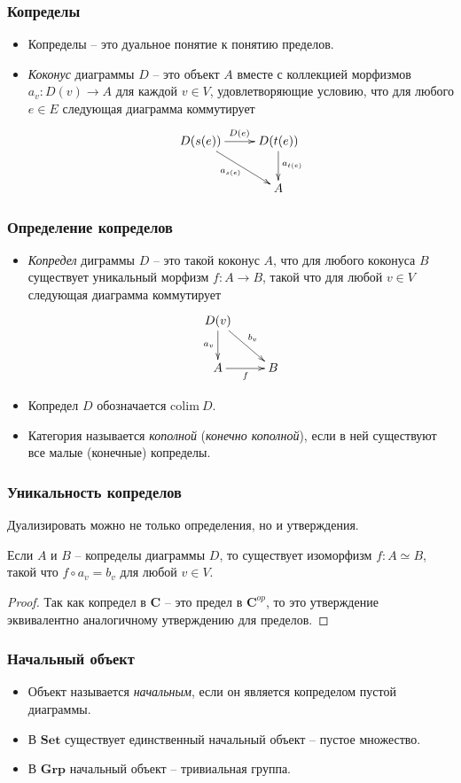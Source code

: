 \documentclass{beamer}
\theoremstyle{definition}
\newcommand{\cat}[1]{\mathbf{#1}}
\renewcommand{\C}{\cat{C}}
\newcommand{\Set}{\cat{Set}}
\newcommand{\Grp}{\cat{Grp}}
\begin{document}
\begin{frame}
\frametitle{Копределы}
\begin{itemize}
\item Копределы -- это дуальное понятие к понятию пределов.
\item \emph{Коконус} диаграммы $D$ -- это объект $A$ вместе с коллекцией морфизмов $a_v : D(v) \to A$ для каждой $v \in V$, удовлетворяющие условию, что для любого $e \in E$ следующая диаграмма коммутирует
\[ \xymatrix{ D(s(e)) \ar[rd]_{a_{s(e)}} \ar[r]^{D(e)} & D(t(e)) \ar[d]^{a_{t(e)}} \\
                                                       & A
            } \]
\end{itemize}
\end{frame}

\begin{frame}
\frametitle{Определение копределов}
\begin{itemize}
\item \emph{Копредел} диграммы $D$ -- это такой коконус $A$, что для любого коконуса $B$ существует уникальный морфизм $f : A \to B$, такой что для любой $v \in V$ следующая диаграмма коммутирует
\[ \xymatrix{ D(v) \ar[d]_{a_v} \ar[dr]^{b_v} \\
              A \ar[r]_f & B
            } \]
\item Копредел $D$ обозначается $\mathrm{colim}\ D$.
\item Категория называется \emph{кополной} (\emph{конечно кополной}), если в ней существуют все малые (конечные) копределы.
\end{itemize}
\end{frame}

\begin{frame}
\frametitle{Уникальность копределов}
Дуализировать можно не только определения, но и утверждения.
\begin{prop}
Если $A$ и $B$ -- копределы диаграммы $D$, то существует изоморфизм $f : A \simeq B$, такой что $f \circ a_v = b_v$ для любой $v \in V$.
\end{prop}
\begin{proof}
Так как копредел в $\C$ -- это предел в $\C^{op}$, то это утверждение эквивалентно аналогичному утверждению для пределов.
\end{proof}
\end{frame}

\begin{frame}
\frametitle{Начальный объект}
\begin{itemize}
\item Объект называется \emph{начальным}, если он является копределом пустой диаграммы.
\item В $\Set$ существует единственный начальный объект -- пустое множество.
\item В $\Grp$ начальный объект -- тривиальная группа.
\end{itemize}
\end{frame}
\end{document}
